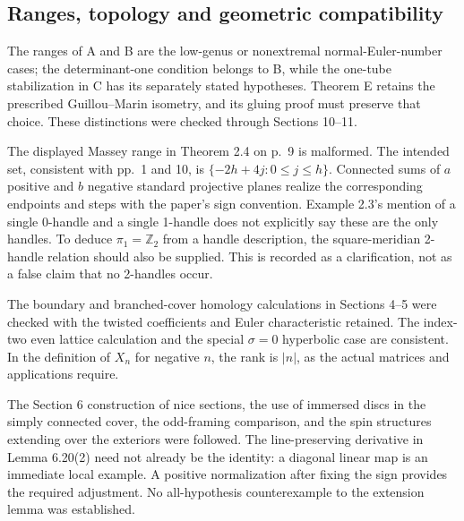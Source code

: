\documentclass[10pt]{article}
\begin{document}
\subsection*{Ranges, topology and geometric compatibility}
The ranges of A and B are the low-genus or nonextremal normal-Euler-number cases; the determinant-one condition belongs to B, while the one-tube stabilization in C has its separately stated hypotheses. Theorem E retains the prescribed Guillou–Marin isometry, and its gluing proof must preserve that choice. These distinctions were checked through Sections 10–11.\par
The displayed Massey range in Theorem 2.4 on p. 9 is malformed. The intended set, consistent with pp. 1 and 10, is \(\{-2h+4j:0\le j\le h\}\). Connected sums of \(a\) positive and \(b\) negative standard projective planes realize the corresponding endpoints and steps with the paper’s sign convention. Example 2.3’s mention of a single 0-handle and a single 1-handle does not explicitly say these are the only handles. To deduce \(\pi_1=\mathbb Z_2\) from a handle description, the square-meridian 2-handle relation should also be supplied. This is recorded as a clarification, not as a false claim that no 2-handles occur.\par
The boundary and branched-cover homology calculations in Sections 4–5 were checked with the twisted coefficients and Euler characteristic retained. The index-two even lattice calculation and the special \(\sigma=0\) hyperbolic case are consistent. In the definition of \(X_n\) for negative \(n\), the rank is \(|n|\), as the actual matrices and applications require.\par
The Section 6 construction of nice sections, the use of immersed discs in the simply connected cover, the odd-framing comparison, and the spin structures extending over the exteriors were followed. The line-preserving derivative in Lemma 6.20(2) need not already be the identity: a diagonal linear map is an immediate local example. A positive normalization after fixing the sign provides the required adjustment. No all-hypothesis counterexample to the extension lemma was established.\par
\end{document}
